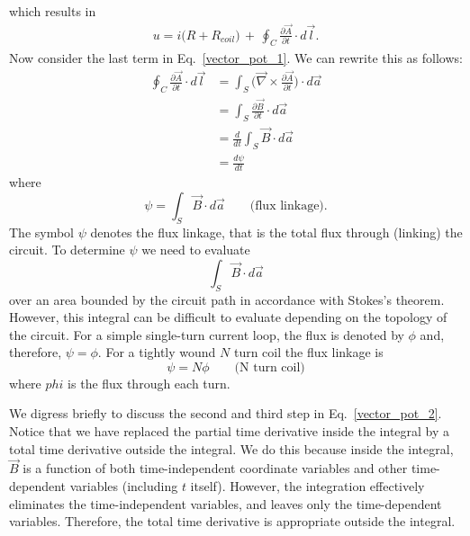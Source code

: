 \documentclass[11pt,a4paper,oneside]{book}
\numberwithin{equation}{section}
\theoremstyle{it}
\theoremstyle{definition}
\begin{document}
which results in
\begin{equation}\label{vector_pot_1}
	\begin{aligned}
		u = i\big(R+R_{coil}\big)\, + \, \oint_{C} \frac{\partial \vec{A}}{\partial t}\cdot d\vec{l}.
	\end{aligned}
\end{equation} 
Now consider the last term in Eq.~\eqref{vector_pot_1}. We can rewrite this as follows:
 \begin{equation}\label{vector_pot_2}
 	\begin{aligned}
 		\oint_{C} \frac{\partial \vec{A}}{\partial t}\cdot d\vec{l} &= \int_S\Big(\vec{\nabla}\times\frac{\partial \vec{A}}{\partial t}\Big)\cdot d\vec{a} \\[8pt]
 		&=\int_S\frac{\partial \vec{B}}{\partial t}\cdot d\vec{a} \\[8pt]
 		&=\frac{d}{dt}\int_S\vec{B}\cdot d\vec{a} \\[8pt]
 		&= \frac{d\psi}{dt}
 	\end{aligned}
 \end{equation} 
where $$\psi = \int_S\vec{B}\cdot d\vec{a} \qquad\text{(flux linkage).}$$
The symbol $\psi$ denotes the flux linkage, that is the total flux through (linking) the circuit. To determine $\psi$ we need to evaluate $$\int_S\vec{B}\cdot d\vec{a}$$ over an area bounded by the circuit path in accordance with Stokes's theorem. However, this integral can be difficult to evaluate depending on the topology of the circuit. For a simple single-turn current loop, the flux is denoted by $\phi$ and, therefore, $\psi=\phi$. For a tightly wound $N$ turn coil the flux linkage is $$\psi=N\phi\qquad\text{(N turn coil)}$$
where $phi$ is the flux through each turn.

We digress briefly to discuss the second and third step in Eq.~\eqref{vector_pot_2}. Notice that we have replaced the partial time derivative inside the integral by a total time derivative outside the integral. We do this because inside the integral, $\vec{B}$ is a function of both time-independent coordinate variables and other time-dependent variables (including $t$ itself). However, the integration effectively eliminates the time-independent variables, and leaves only the time-dependent variables. Therefore, the total time derivative is appropriate outside the integral. 
\end{document}

